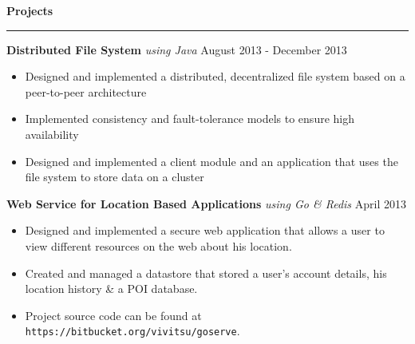 \documentclass[10pt]{article}
\begin{document}
\textbf{Projects}
\smallskip
\hrule
\textbf{Distributed File System} \textit{using Java} \hfill August 2013 - December 2013
\begin{itemize}
    \item Designed and implemented a distributed, decentralized file system based on a peer-to-peer architecture
    \item Implemented consistency and fault-tolerance models to ensure high availability
    \item Designed and implemented a client module and an application that uses the file system to store data on a cluster
\end{itemize}
\textbf{Web Service for Location Based Applications} \textit{using Go \& Redis} \hfill April 2013
\begin{itemize}
    \item Designed and implemented a secure web application that allows a user to view different resources on the web about his location.
    \item Created and managed a datastore that stored a user's account details, his location history \& a POI database.
    \item Project source code can be found at \texttt{https://bitbucket.org/vivitsu/goserve}.
\end{itemize}
\end{document}
